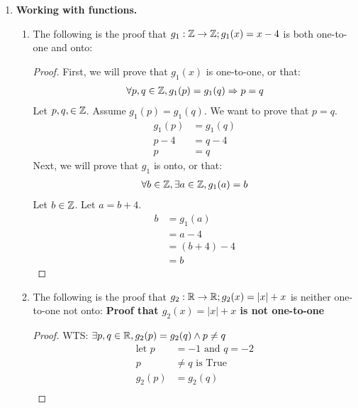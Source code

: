 \documentclass[12pt]{article}
\theoremstyle{definition}
\begin{document}
    \begin{enumerate}
        \item \textbf{Working with functions.}
        \begin{enumerate}[i]
            \item The following is the proof that $g_1: \mathbb Z \rightarrow \mathbb Z; g_1(x) = x-4$ is both one-to-one and onto:
            \begin{proof}
                First, we will prove that $g_1(x)$ is one-to-one, or that: \begin{align*}
                    \forall p, q \in \mathbb Z, g_1(p) = g_1(q) \mathrel{\Rightarrow} p = q
                \end{align*} Let $p, q, \in \mathbb Z$. Assume $g_1(p) = g_1(q)$. We want to prove that $p=q$.
                \begin{align*}
                    g_1(p) &= g_1(q)\\
                    p-4 &= q-4\\
                    p &= q \tag{add 4 to both sides}
                \end{align*}
                Next, we will prove that $g_1$ is onto, or that:
                \begin{align*}
                    \forall b \in \mathbb Z, \exists a \in \mathbb Z, g_1(a) = b
                \end{align*}Let $b \in \mathbb Z$. Let $a = b + 4$.
                \begin{align*}
                    b &= g_1(a)\\
                    &= a - 4\\
                    &= (b + 4) - 4\\
                    &= b
                \end{align*}
            \end{proof}
            \item The following is the proof that $g_2: \mathbb R \rightarrow \mathbb R; g_2(x) = |x| + x$ is neither one-to-one not onto:
            \textbf{Proof that $g_2(x) = |x| + x$ is not one-to-one}
            \begin{proof}
                WTS: $\exists p, q \in \mathbb R, g_2(p) = g_2(q) \land p \neq q$
                \begin{align*}
                    \text{let } p &= -1 \text{ and } q = -2 \\
                    p &\neq q \text{ is True} \\ 
                    g_2(p) &= g_2(q) \\ 

\end{align*}
\end{proof}
\end{enumerate}
\end{enumerate}
\end{document}
